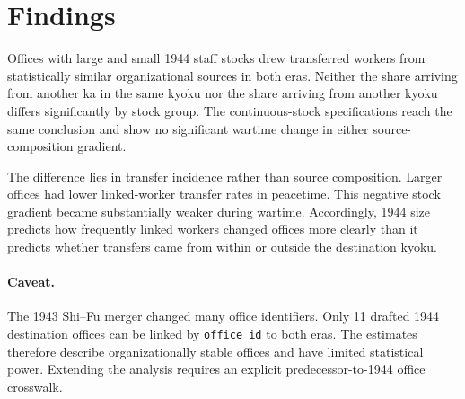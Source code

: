 \section*{Findings}
Offices with large and small 1944 staff stocks drew transferred workers from statistically similar organizational sources in both eras. Neither the share arriving from another ka in the same kyoku nor the share arriving from another kyoku differs significantly by stock group. The continuous-stock specifications reach the same conclusion and show no significant wartime change in either source-composition gradient.

The difference lies in transfer incidence rather than source composition. Larger offices had lower linked-worker transfer rates in peacetime. This negative stock gradient became substantially weaker during wartime. Accordingly, 1944 size predicts how frequently linked workers changed offices more clearly than it predicts whether transfers came from within or outside the destination kyoku.

\paragraph{Caveat.} The 1943 Shi--Fu merger changed many office identifiers. Only 11 drafted 1944 destination offices can be linked by \texttt{office\_id} to both eras. The estimates therefore describe organizationally stable offices and have limited statistical power. Extending the analysis requires an explicit predecessor-to-1944 office crosswalk.
